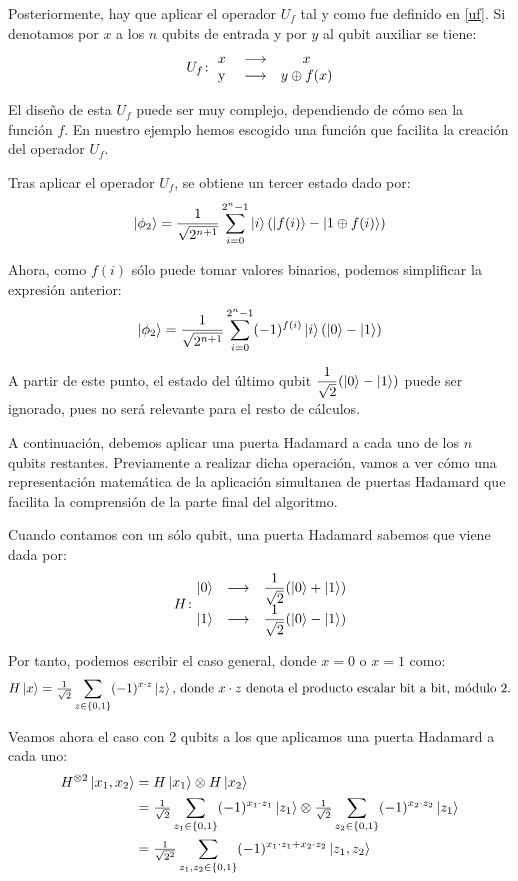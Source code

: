 Posteriormente, hay que aplicar el operador $U_f$ tal y como fue definido en \ref{uf}. Si denotamos por $x$ a los $n$ qubits de entrada y por $y$ al qubit auxiliar se tiene:
\begin{equation}
U_f\colon \begin{matrix}x&\longrightarrow& x\\ \mathrm{\ y\ }&\longrightarrow& y\oplus f(x)\end{matrix}
\end{equation}

El diseño de esta $U_f$ puede ser muy complejo, dependiendo de cómo sea la función $f$. En nuestro ejemplo hemos escogido una función que facilita la creación del operador $U_f$.

Tras aplicar el operador $U_f$, se obtiene un tercer estado dado por:
\begin{equation}
\left|\phi_2\right\rangle = \dfrac{1}{\sqrt{2^{n+1}}} \sum\limits_{i=0}^{2^n - 1} \left|i\right\rangle(\left|f(i)\right\rangle-\left|1\oplus f(i)\right\rangle) 
\end{equation}

Ahora, como $f(i)$ sólo puede tomar valores binarios, podemos simplificar la expresión anterior:
\begin{equation}
\left|\phi_2\right\rangle = \dfrac{1}{\sqrt{2^{n+1}}} \sum\limits_{i=0}^{2^n - 1} (-1)^{f(i)}\left|i\right\rangle(\left|0\right\rangle-\left|1\right\rangle) 
\label{phi2}
\end{equation}


A partir de este punto, el estado del último qubit $\dfrac{1}{\sqrt{2}}(\left|0\right\rangle-\left|1\right\rangle)$ puede ser ignorado, pues no será relevante para el resto de cálculos.

A continuación, debemos aplicar una puerta Hadamard a cada uno de los $n$ qubits restantes. Previamente a realizar dicha operación, vamos a ver cómo una representación matemática de la aplicación simultanea de puertas Hadamard que facilita la comprensión de la parte final del algoritmo.

Cuando contamos con un sólo qubit, una puerta Hadamard sabemos que viene dada por: \[H\colon \begin{matrix}\left|0\right\rangle&\longrightarrow& \dfrac{1}{\sqrt{2}}(\left|0\right\rangle+\left|1\right\rangle)\\ \left|1\right\rangle&\longrightarrow& \dfrac{1}{\sqrt{2}}(\left|0\right\rangle-\left|1\right\rangle)\end{matrix}\]

Por tanto, podemos escribir el caso general, donde $x=0$ o $x=1$ como:
\begin{equation}
H\left|x\right\rangle = \tfrac{1}{\sqrt{2}}\sum\limits_{z\in\{0,1\}} (-1)^{x\cdot z}\left|z\right\rangle \textrm{, donde $x\cdot z$ denota el producto escalar bit a bit, módulo 2.}
\end{equation}

Veamos ahora el caso con 2 qubits a los que aplicamos una puerta Hadamard a cada uno:
\begin{equation}
\begin{split}
H^{\otimes 2}\left|x_1,x_2\right\rangle & = H\left|x_1\right\rangle \otimes H\left|x_2\right\rangle \\
& = \tfrac{1}{\sqrt{2}}\sum\limits_{z_1\in\{0,1\}} (-1)^{x_1\cdot z_1}\left|z_1\right\rangle \otimes \tfrac{1}{\sqrt{2}}\sum\limits_{z_2\in\{0,1\}} (-1)^{x_2\cdot z_2}\left|z_1\right\rangle \\
& = \tfrac{1}{\sqrt{2^2}}\sum\limits_{z_1,z_2\in\{0,1\}} (-1)^{x_1\cdot z_1+x_2\cdot z_2}\left|z_1,z_2\right\rangle
\end{split}
\end{equation}


